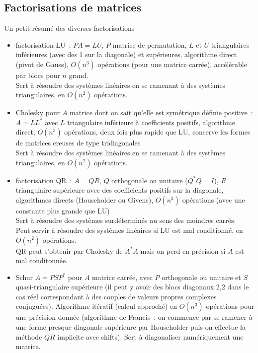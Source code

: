 \documentclass[a4paper,11pt]{book}
\begin{document}
\begin{giacjshere}
\section{Factorisations de matrices}
Un petit r\'esum\'e des diverses factorisations
\begin{itemize}
\item factorisation LU~: $PA=LU$, $P$ matrice de permutation, $L$ et $U$
triangulaires inf\'erieures (avec des 1 sur la diagonale)
et sup\'erieures, algorithme direct 
(pivot de Gauss), $O(n^3)$ op\'erations (pour une matrice carr\'ee), 
acc\'el\'erable par blocs pour $n$ grand.\\
Sert \`a r\'esoudre des syst\`emes lin\'eaires en se
ramenant \`a des syst\`emes triangulaires, en $O(n^2)$ op\'erations.
\item Cholesky pour $A$ matrice dont on sait qu'elle est 
sym\'etrique d\'efinie positive~: $A=LL^*$ avec $L$ triangulaire
inf\'erieure \`a coefficients positifs, algorithme direct, $O(n^3)$
op\'erations, deux fois plus rapide que LU, conserve les formes
de matrices creuses de type tridiagonales\\
Sert \`a r\'esoudre des syst\`emes lin\'eaires en se
ramenant \`a des syst\`emes triangulaires, en $O(n^2)$ op\'erations.
\item factorisation QR~: $A=QR$, $Q$ orthogonale ou unitaire ($Q^* Q=I$),
$R$ triangulaire sup\'erieure avec des coefficients positifs sur la 
diagonale, algorithmes directs (Householder ou Givens), $O(n^3)$
op\'erations (avec une constante plus grande que LU)\\
Sert \`a r\'esoudre des syst\`emes surd\'etermin\'es
au sens des moindres carr\'es.\\
Peut servir \`a r\'esoudre des syst\`emes lin\'eaires si LU est
mal conditionn\'e, en $O(n^2)$ op\'erations.\\
QR peut s'obtenir par Cholesky de $A^* A$ mais on perd en pr\'ecision
si $A$ est mal conditonn\'ee.
\item Schur $A=PSP^*$ pour $A$ matrice carr\'ee,
avec $P$ orthogonale ou unitaire et $S$ quasi-triangulaire
sup\'erieure (il peut y avoir des blocs diagonaux 2,2 dans le cas r\'eel
correspondant \`a des couples de valeurs propres complexes conjugu\'ees).
Algorithme it\'eratif (calcul approch\'e) en $O(n^3)$
op\'erations pour une pr\'ecision donn\'ee (algorithme
de Francis~: on commence par se
ramener \`a une forme
presque diagonale sup\'erieure par Householder
puis on effectue la m\'ethode $QR$ implicite avec shifts). 
Sert \`a diagonaliser num\'eriquement une matrice.

\end{itemize}
\end{giacjshere}
\end{document}

